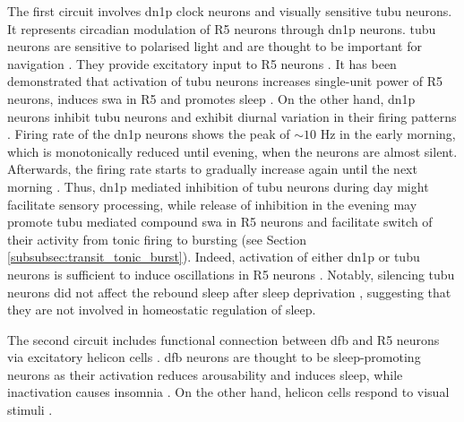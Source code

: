 \documentclass[../main.tex]{subfiles}
\begin{document}
The first circuit involves \gls{dn1p} clock neurons and visually sensitive \gls{tubu} neurons. It represents circadian modulation of R5 neurons through \gls{dn1p} neurons. \gls{tubu} neurons are sensitive to polarised light and are thought to be important for navigation \cite{suarez-grimaltNeuralArchitectureSleep2021}. They provide excitatory input to R5 neurons \cite{duanVisualPathwayCentral2023}. It has been demonstrated that activation of \gls{tubu} neurons increases single-unit power of R5 neurons, induces \gls{swa} in R5 and promotes sleep \cite{andreaniCircadianProgrammingEllipsoid2022,raccugliaNetworkSpecificSynchronizationElectrical2019}. On the other hand, \gls{dn1p} neurons inhibit \gls{tubu} neurons \cite{lamazeWakePromotingCircadianOutput2018} and exhibit diurnal variation in their firing patterns \cite{flourakisConservedBicycleModel2015}. Firing rate of the \gls{dn1p} neurons shows the peak of $\sim 10$ Hz in the early morning, which is monotonically reduced until evening, when the neurons are almost silent. Afterwards, the firing rate starts to gradually increase again until the next morning \cite{flourakisConservedBicycleModel2015}. Thus, \gls{dn1p} mediated inhibition of \gls{tubu} neurons during day might facilitate sensory processing, while release of inhibition in the evening may promote \gls{tubu} mediated compound \gls{swa} in R5 neurons and facilitate switch of their activity from tonic firing to bursting (see Section \ref{subsubsec:transit_tonic_burst}). Indeed, activation of either \gls{dn1p} or \gls{tubu} neurons is sufficient to induce oscillations in R5 neurons \cite{suarez-grimaltNeuralArchitectureSleep2021,raccugliaNetworkSpecificSynchronizationElectrical2019}. Notably, silencing \gls{tubu} neurons did not affect the rebound sleep after sleep deprivation \cite{andreaniCircadianProgrammingEllipsoid2022}, suggesting that they are not involved in homeostatic regulation of sleep.

The second circuit includes functional connection between \gls{dfb} and R5 neurons via excitatory helicon cells \cite{raccugliaCoherentMultilevelNetwork2022}. \gls{dfb} neurons are thought to be sleep-promoting neurons as their activation reduces arousability and induces sleep, while inactivation causes insomnia \cite{pimentelOperationHomeostaticSleep2016,suarez-grimaltNeuralArchitectureSleep2021}. On the other hand, helicon cells respond to visual stimuli \cite{shaferRegulationDrosophilaSleep2021}.
\end{document}
